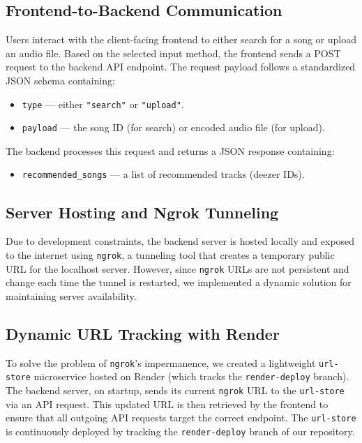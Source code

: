 \documentclass[12pt, titlepage]{article}
\begin{document}
\begingroup
\color{red}
\subsection*{Frontend-to-Backend Communication}
Users interact with the client-facing frontend to either search for a song or upload an audio file. Based on the selected input method, the frontend sends a POST request to the backend API endpoint. The request payload follows a standardized JSON schema containing:
\begin{itemize}
    \item \texttt{type} — either \texttt{"search"} or \texttt{"upload"}.
    \item \texttt{payload} — the song ID (for search) or encoded audio file (for upload).
\end{itemize}

The backend processes this request and returns a JSON response containing:
\begin{itemize}
    \item \texttt{recommended\_songs} — a list of recommended tracks (deezer IDs).
\end{itemize}

\subsection*{Server Hosting and Ngrok Tunneling}
Due to development constraints, the backend server is hosted locally and exposed to the internet using \texttt{ngrok}, a tunneling tool that creates a temporary public URL for the localhost server. However, since \texttt{ngrok} URLs are not persistent and change each time the tunnel is restarted, we implemented a dynamic solution for maintaining server availability.

\subsection*{Dynamic URL Tracking with Render}
To solve the problem of \texttt{ngrok}'s impermanence, we created a lightweight \texttt{url-store} microservice hosted on Render (which tracks the \texttt{render-deploy} branch). The backend server, on startup, sends its current \texttt{ngrok} URL to the \texttt{url-store} via an API request. This updated URL is then retrieved by the frontend to ensure that all outgoing API requests target the correct endpoint. The \texttt{url-store} is continuously deployed by tracking the \texttt{render-deploy} branch of our repository.
\end{document}
